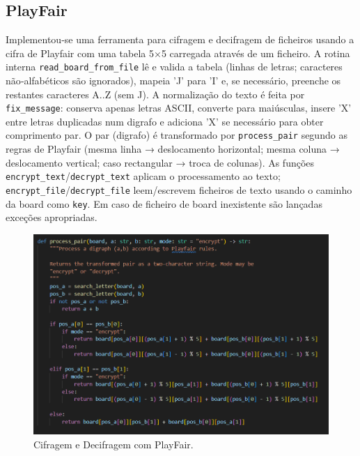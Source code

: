 \documentclass[a4paper]{article}
\begin{document}
\subsection{PlayFair}
Implementou‑se uma ferramenta para cifragem e decifragem de ficheiros usando a cifra de Playfair com uma tabela 5×5 carregada através de um ficheiro.
A rotina interna \texttt{read\_board\_from\_file} lê e valida a tabela (linhas de letras; caracteres não‑alfabéticos são ignorados), mapeia 'J' para 'I' e, se necessário,
preenche os restantes caracteres A..Z (sem J). A normalização do texto é feita por \texttt{fix\_message}: conserva apenas letras ASCII, converte para maiúsculas,
insere 'X' entre letras duplicadas num digrafo e adiciona 'X' se necessário para obter comprimento par. O par (digrafo) é transformado por \texttt{process\_pair}
segundo as regras de Playfair (mesma linha → deslocamento horizontal; mesma coluna → deslocamento vertical; caso rectangular → troca de colunas).
As funções \texttt{encrypt\_text}/\texttt{decrypt\_text} aplicam o processamento ao texto; \texttt{encrypt\_file}/\texttt{decrypt\_file} leem/escrevem
ficheiros de texto usando o caminho da board como \texttt{key}. Em caso de ficheiro de board inexistente são lançadas exceções apropriadas.\\

\begin{figure}[H]
	\centering
	\includegraphics[width=\textwidth]{Recursos/playfair.png}
	\caption{Cifragem e Decifragem com PlayFair.}
	\label{fig:playfair}
\end{figure}

\newpage
\end{document}
